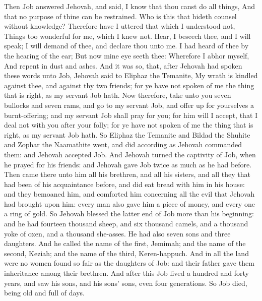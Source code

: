 Then Job answered Jehovah, and said,  I know that thou canst do all things, And that no purpose of thine can be restrained.  Who is this that hideth counsel without knowledge? Therefore have I uttered that which I understood not, Things too wonderful for me, which I knew not.  Hear, I beseech thee, and I will speak; I will demand of thee, and declare thou unto me.  I had heard of thee by the hearing of the ear; But now mine eye seeth thee:  Wherefore I abhor myself, And repent in dust and ashes.  And it was so, that, after Jehovah had spoken these words unto Job, Jehovah said to Eliphaz the Temanite, My wrath is kindled against thee, and against thy two friends; for ye have not spoken of me the thing that is right, as my servant Job hath. Now therefore, take unto you seven bullocks and seven rams, and go to my servant Job, and offer up for yourselves a burnt-offering; and my servant Job shall pray for you; for him will I accept, that I deal not with you after your folly; for ye have not spoken of me the thing that is right, as my servant Job hath. So Eliphaz the Temanite and Bildad the Shuhite and Zophar the Naamathite went, and did according as Jehovah commanded them: and Jehovah accepted Job.  And Jehovah turned the captivity of Job, when he prayed for his friends: and Jehovah gave Job twice as much as he had before. Then came there unto him all his brethren, and all his sisters, and all they that had been of his acquaintance before, and did eat bread with him in his house: and they bemoaned him, and comforted him concerning all the evil that Jehovah had brought upon him: every man also gave him a piece of money, and every one a ring of gold. So Jehovah blessed the latter end of Job more than his beginning: and he had fourteen thousand sheep, and six thousand camels, and a thousand yoke of oxen, and a thousand she-asses. He had also seven sons and three daughters. And he called the name of the first, Jemimah; and the name of the second, Keziah; and the name of the third, Keren-happuch. And in all the land were no women found so fair as the daughters of Job: and their father gave them inheritance among their brethren. And after this Job lived a hundred and forty years, and saw his sons, and his sons’ sons, even four generations. So Job died, being old and full of days. 